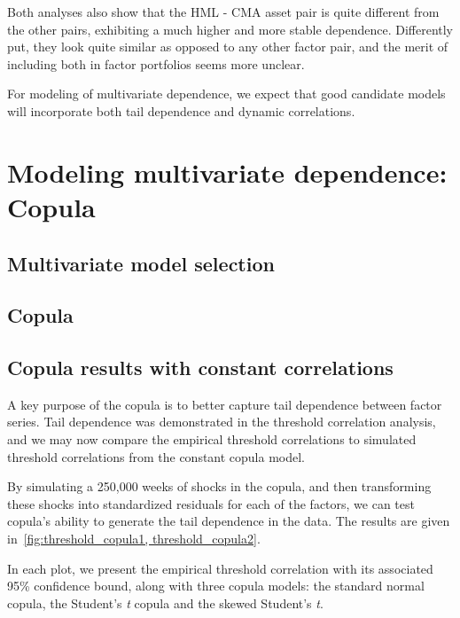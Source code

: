 Both analyses also show that the HML - CMA asset pair is quite different from the other pairs, exhibiting a much higher and more stable dependence. Differently put, they look quite similar as opposed to any other factor pair, and the merit of including both in factor portfolios seems more unclear.

For modeling of multivariate dependence, we expect that good candidate models will incorporate both tail dependence and dynamic correlations.

\section{Modeling multivariate dependence: Copula} %


\subsection{Multivariate model selection}

\subsection{Copula}

\subsection{Copula results with constant correlations}
A key purpose of the copula is to better capture tail dependence between factor series. Tail dependence was demonstrated in the threshold correlation analysis, and we may now compare the empirical threshold correlations to simulated threshold correlations from the constant copula model. 

By simulating a 250,000 weeks of shocks in the copula, and then transforming these shocks into standardized residuals for each of the factors, we can test copula's ability to generate the tail dependence in the data. The results are given in~\autoref{fig:threshold_copula1, threshold_copula2}.


In each plot, we present the empirical threshold correlation with its associated 95\% confidence bound, along with three copula models: the standard normal copula, the Student's \textit{t} copula and the skewed Student's \textit{t}.

